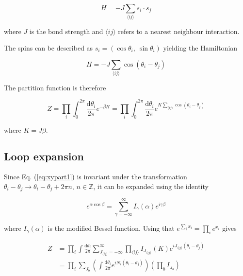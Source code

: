\begin{equation}
    H = -J\sum_{\langle ij \rangle} s_i \cdot s_j
\end{equation}

\noindent where $J$ is the bond strength and $\langle ij \rangle$ refers to a nearest neighbour interaction.

The spins can be described as $s_i = (\cos \theta_i, \  \sin \theta_i)$ yielding the Hamiltonian

\begin{equation}
    H = - J \sum_{\langle ij \rangle} \cos(\theta_i - \theta_j)
\label{eq:xymodel}
\end{equation}

The partition function is therefore

\begin{equation}
    Z = \prod_i \int_{0}^{2\pi} \frac{\mathrm d \theta_i}{2 \pi} e^{-\beta H} = \prod_i \int_{0}^{2\pi} \frac{\mathrm d \theta_i}{2 \pi} e^{K \sum_{\langle ij \rangle} \cos(\theta_i - \theta_j)}
\label{eq:xypart1}
\end{equation}

\noindent where $K = J \beta$.

\subsection{Loop expansion}
\label{subsec:XYLoopexp}

Since Eq. (\ref{eq:xypart1}) is invariant under the transformation $\theta_i - \theta_j \rightarrow \theta_i - \theta_j + 2 \pi n$, $n \in \mathbb{Z}$, it can be expanded using the identity

\begin{equation}
    e^{\alpha \cos \beta} = \sum_{\gamma = -\infty}^{\infty} I_\gamma ( \alpha ) e^{i \gamma \beta}
\end{equation}

\noindent where $I_\gamma(\alpha)$ is the modified Bessel function. Using that $e^{\sum_i x_i} = \prod_i e^{x_i}$ gives

\begin{align}
    Z &= \prod_i \int \frac{\mathrm d \theta_i}{2 \pi} \sum_{J_{\langle ij \rangle} = -\infty}^{\infty} \prod_{\langle ij \rangle} I_{J_{\langle ij \rangle}} ( K ) e^{i J_{\langle ij \rangle} (\theta_i - \theta_j)} \\
\label{eq:xypart2}
% 
    &=  \prod_i \sum_{J_b} \left ( \int \frac{\mathrm d \theta_i}{2 \pi} e^{i N_i (\theta_i - \theta_j)} \right ) \left ( \prod_b I_{J_b} \right ) 
\end{align}

